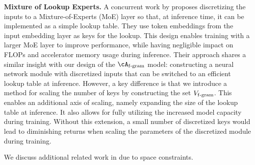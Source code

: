 \textbf{Mixture of Lookup Experts.} A concurrent work by \citet{jie2025mixture} proposes discretizing the inputs to a Mixture-of-Experts (MoE) layer so that, at inference time, it can be implemented as a simple lookup table. They use token embeddings from the input embedding layer as keys for the lookup. This design enables training with a larger MoE layer to improve performance, while having negligible impact on FLOPs and accelerator memory usage during inference. Their approach shares a similar insight with our design of the $\Afgram$ model: constructing a neural network module with discretized inputs that can be switched to an efficient lookup table at inference. However, a key difference is that we introduce a method for scaling the number of keys by constructing the set $V_{\mathrm{f\text{-}gram}}$. This enables an additional axis of scaling, namely  expanding the size of the lookup table at inference. It also allows for fully utilizing the increased model capacity during training. Without this extension, a small number of discretized keys would lead to diminishing returns when scaling the parameters of the discretized module during training.

We discuss additional related work in  due to space constraints.
